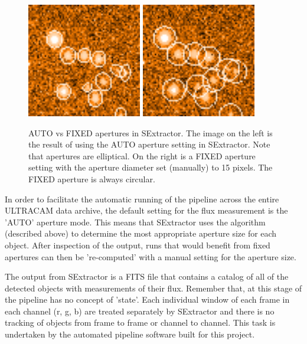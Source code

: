 \begin{enumerate}
\begin{figure}
  \centering
  \includegraphics[width=50mm]{images/sex_apertures_auto_cropped.png}
  \includegraphics[width=50mm]{images/sex_apertures_fixed_cropped.png}
  \caption{AUTO vs FIXED apertures in SExtractor. The image on the left is the result of using the AUTO aperture setting in SExtractor. Note that apertures are elliptical. On the right is a FIXED aperture setting with the aperture diameter set (manually) to 15 pixels. The FIXED aperture is always circular.}
\label{fig:fixedautoapertures}
\end{figure}

 
\end{enumerate}

In order to facilitate the automatic running of the pipeline across the entire ULTRACAM data archive, the default setting for the flux measurement is the 'AUTO' aperture mode. This means that SExtractor uses the algorithm (described above) to determine the most appropriate aperture size for each object. After inspection of the output, runs that would benefit from fixed apertures can then be 're-computed' with a manual setting for the aperture size. 

The output from SExtractor is a FITS file that contains a catalog of all of the detected objects with measurements of their flux. Remember that, at this stage of the pipeline has no concept of 'state'. Each individual window of each frame in each channel (r, g, b) are treated separately by SExtractor and there is no tracking of objects from frame to frame or channel to channel. This task is undertaken by the automated pipeline software built for this project. 

